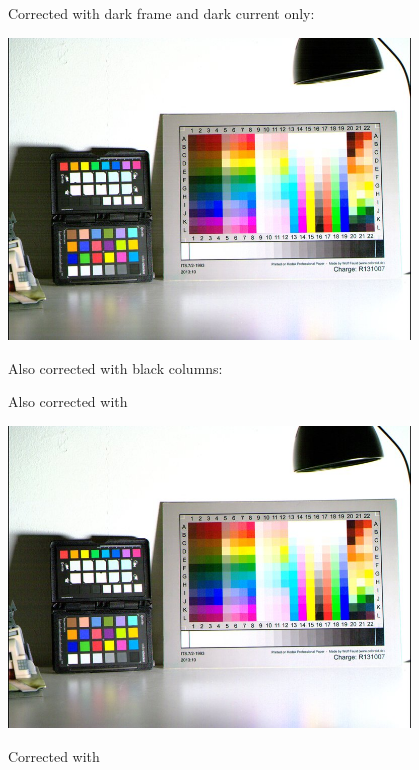 Corrected with dark frame and dark current only:\\
 
\begin{center}
\includegraphics[height=8cm]{images/10ms+4-no-blackcol-small}
\end{center}

Also corrected with black columns: 

\begin{center}
\end{center}

Also corrected with  

\begin{center}
\includegraphics[height=8cm]{images/10ms+4-fixrn-small}
\end{center}

Corrected with 

